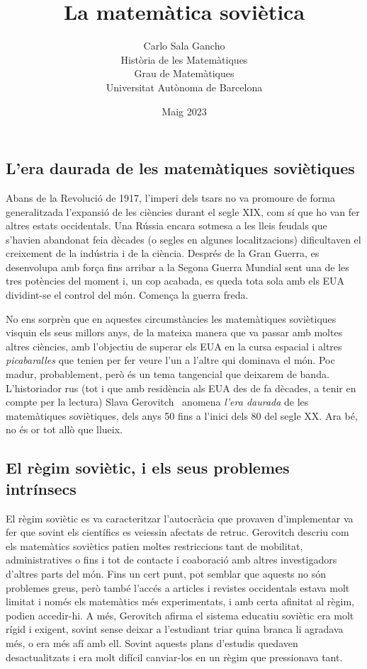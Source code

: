\documentclass[a4paper, 11pt]{article}
\title{La matemàtica soviètica}
\author{
  Carlo Sala Gancho\\
  Història de les Matemàtiques\\
  Grau de Matemàtiques\\
  Universitat Autònoma de Barcelona } \date{Maig 2023}
\begin{document}
\frenchspacing

\maketitle

\subsection*{L'era daurada de les matemàtiques soviètiques}

Abans de la Revolució de 1917, l'imperi dels tsars no va promoure de forma generalitzada l'expansió de les ciències
durant el segle XIX, com sí que ho van fer altres estats occidentals. Una Rússia encara sotmesa a les lleis feudals que
s'havien abandonat feia dècades (o segles en algunes localitzacions) dificultaven el creixement de la indústria i de la
ciència. Després de la Gran Guerra, es desenvolupa amb força fins arribar a la Segona Guerra Mundial sent una de les
tres potències del moment i, un cop acabada, es queda tota sola amb els EUA dividint-se el control del món. Comença la
guerra freda.

No ens sorprèn que en aquestes circumstàncies les matemàtiques soviètiques visquin els seus millors anys, de la mateixa
manera que va passar amb moltes altres ciències, amb l'objectiu de superar els EUA en la cursa espacial i altres
\textit{picabaralles} que tenien per fer veure l'un a l'altre qui dominava el món. Poc madur, probablement, però és un
tema tangencial que deixarem de banda. L'historiador rus (tot i que amb residència als EUA des de fa dècades, a tenir
en compte per la lectura) Slava Gerovitch~\cite{bib:wiki:slava} anomena \textit{l'era daurada} de les matemàtiques
soviètiques, dels anys 50 fins a l'inici dels 80 del segle XX. Ara bé, no és or tot allò que llueix.

\subsection*{El règim soviètic, i els seus problemes intrínsecs}

El règim soviètic es va caracteritzar l'autocràcia que provaven d'implementar va fer que sovint els científics es
veiessin afectats de retruc. Gerovitch descriu com els matemàtics soviètics patien moltes restriccions tant de
mobilitat, administratives o fins i tot de contacte i co\lgem{}aboració amb altres investigadors d'altres parts del
món. Fins un cert punt, pot semblar que aquests no són problemes greus, però també l'accés a articles i revistes
occidentals estava molt limitat i només els matemàtics més experimentats, i amb certa afinitat al règim, podien
accedir-hi. A més, Gerovitch afirma el sistema educatiu soviètic era molt rígid i exigent, sovint sense deixar a
l'estudiant triar quina branca li agradava més, o era més afí amb ell. Sovint aquests plans d'estudis quedaven
desactualitzats i era molt difícil canviar-los en un règim que pressionava tant.
\end{document}
